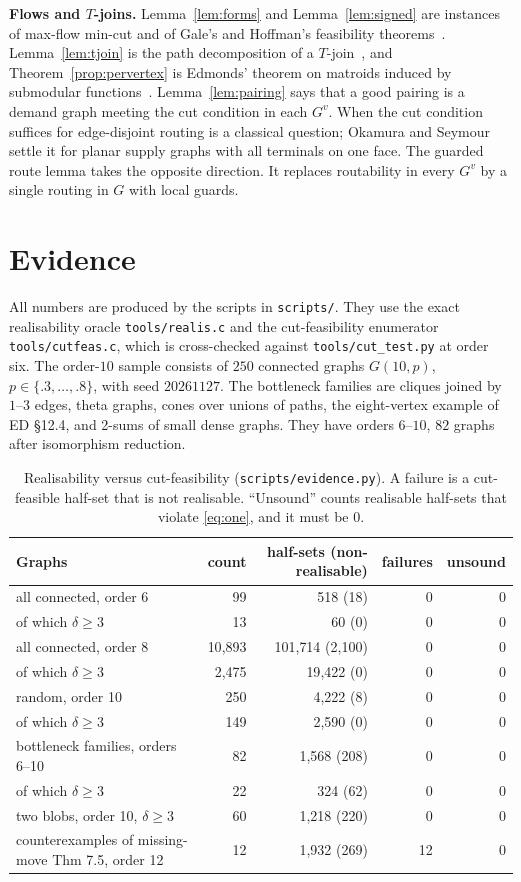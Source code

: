 \documentclass[11pt]{amsart}
\theoremstyle{definition}
\begin{document}
\textbf{Flows and $T$-joins.} Lemma~\ref{lem:forms} and Lemma~\ref{lem:signed} are instances of
max-flow min-cut and of Gale's and Hoffman's feasibility theorems~\cite{Gale57,Hof60}.
Lemma~\ref{lem:tjoin} is the path decomposition of a $T$-join~\cite{EJ73}, and
Theorem~\ref{prop:pervertex} is Edmonds' theorem on matroids induced by submodular
functions~\cite{Edm70}. Lemma~\ref{lem:pairing} says that a good pairing is a demand graph meeting
the cut condition in each $G^v$. When the cut condition suffices for edge-disjoint routing is a
classical question; Okamura and Seymour~\cite{OS81} settle it for planar supply graphs with all
terminals on one face. The guarded route lemma takes the opposite direction. It replaces routability
in every $G^v$ by a single routing in $G$ with local guards.

\section{Evidence}\label{sec:evidence}

All numbers are produced by the scripts in \texttt{scripts/}. They use the exact realisability oracle
\texttt{tools/realis.c} and the cut-feasibility enumerator \texttt{tools/cutfeas.c}, which is
cross-checked against \texttt{tools/cut\_test.py} at order six. The order-$10$ sample consists of $250$
connected graphs $G(10,p)$, $p\in\{.3,\dots,.8\}$, with seed $20261127$. The bottleneck families are
cliques joined by $1$--$3$ edges, theta graphs, cones over unions of paths, the eight-vertex example of
ED \S12.4, and 2-sums of small dense graphs. They have orders $6$--$10$, $82$ graphs after isomorphism
reduction.

\begin{table}[h]
\caption{Realisability versus cut-feasibility (\texttt{scripts/evidence.py}). A failure is a
cut-feasible half-set that is not realisable. ``Unsound'' counts realisable half-sets that violate
\eqref{eq:one}, and it must be $0$.}\label{tab:emm}
\begin{tabular}{lrrrr}
\toprule
Graphs & count & half-sets (non-realisable) & failures & unsound\\
\midrule
all connected, order 6 & 99 & 518 (18) & 0 & 0\\
\quad of which $\delta\ge3$ & 13 & 60 (0) & 0 & 0\\
all connected, order 8 & 10{,}893 & 101{,}714 (2{,}100) & 0 & 0\\
\quad of which $\delta\ge3$ & 2{,}475 & 19{,}422 (0) & 0 & 0\\
random, order 10 & 250 & 4{,}222 (8) & 0 & 0\\
\quad of which $\delta\ge3$ & 149 & 2{,}590 (0) & 0 & 0\\
bottleneck families, orders 6--10 & 82 & 1{,}568 (208) & 0 & 0\\
\quad of which $\delta\ge3$ & 22 & 324 (62) & 0 & 0\\
two blobs, order 10, $\delta\ge3$ & 60 & 1{,}218 (220) & 0 & 0\\
counterexamples of missing-move Thm 7.5, order 12 & 12 & 1{,}932 (269) & 12 & 0\\
\bottomrule
\end{tabular}
\end{table}
\end{document}
